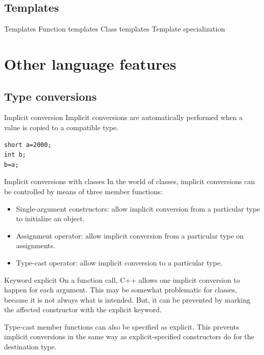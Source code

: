 \documentclass{beamer}
\begin{document}
\subsection{Templates}

\begin{frame}{Templates}
Function templates
Class templates
Template specialization
\end{frame}

\section{Other language features}
\subsection{Type conversions}
\begin{frame}[fragile]{Implicit conversion}
Implicit conversions are automatically performed when a value is copied to a
compatible type.
\begin{lstlisting}
short a=2000;
int b;
b=a;
\end{lstlisting}
\end{frame}

\begin{frame}{Implicit conversions with classes}
In the world of classes, implicit conversions can be controlled by means of three member functions:
\begin{itemize}
  \item Single-argument constructors: allow implicit conversion from a
  particular type to initialize an object.
  \item Assignment operator: allow implicit conversion from a particular type on
  assignments.
  \item Type-cast operator: allow implicit conversion to a particular type.
\end{itemize}
\end{frame}

\begin{frame}{Keyword explicit}
On a function call, C++ allows one implicit conversion to happen for each
argument. This may be somewhat problematic for classes, because it is not always
what is intended. But, it can be prevented by marking the affected constructor
with the explicit keyword.

Type-cast member functions can also be specified as explicit. This prevents
implicit conversions in the same way as explicit-specified constructors do for
the destination type.
\end{frame}
\end{document}
